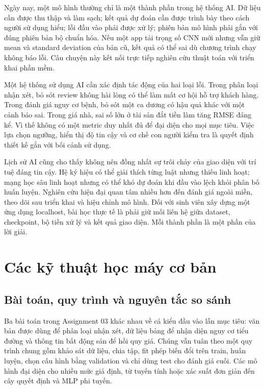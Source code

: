 \documentclass[12pt,a4paper]{report}
\begin{document}
Ngày nay, một mô hình thường chỉ là một thành phần trong hệ thống AI. Dữ liệu cần được thu thập và làm sạch; kết quả dự đoán cần được trình bày theo cách người sử dụng hiểu; lỗi đầu vào phải được xử lý; phiên bản mô hình phải gắn với đúng phiên bản bộ chuẩn hóa. Nếu một app tải trọng số CNN mới nhưng vẫn giữ mean và standard deviation của bản cũ, kết quả có thể sai dù chương trình chạy không báo lỗi. Câu chuyện này kết nối trực tiếp nghiên cứu thuật toán với triển khai phần mềm.

Một hệ thống sử dụng AI cần xác định tác động của hai loại lỗi. Trong phân loại nhận xét, bỏ sót review không hài lòng có thể làm mất cơ hội hỗ trợ khách hàng. Trong đánh giá nguy cơ bệnh, bỏ sót một ca dương có hậu quả khác với một cảnh báo sai. Trong giá nhà, sai số lớn ở tài sản đắt tiền làm tăng RMSE đáng kể. Vì thế không có một metric duy nhất đủ để đại diện cho mọi mục tiêu. Việc lựa chọn ngưỡng, hiển thị độ tin cậy và cơ chế con người kiểm tra là quyết định thiết kế gắn với bối cảnh sử dụng.

Lịch sử AI cũng cho thấy không nên đồng nhất sự trôi chảy của giao diện với trí tuệ đáng tin cậy. Hệ ký hiệu có thể giải thích từng luật nhưng thiếu linh hoạt; mạng học sâu linh hoạt nhưng có thể khó dự đoán khi đầu vào lệch khỏi phân bố huấn luyện. Nghiên cứu hiện đại quan tâm nhiều hơn đến đánh giá ngoài miền, theo dõi sau triển khai và hiệu chỉnh mô hình. Đối với sinh viên xây dựng một ứng dụng localhost, bài học thực tế là phải giữ mối liên hệ giữa dataset, checkpoint, bộ tiền xử lý và kết quả giao diện. Mỗi thành phần là một phần của lời giải.

\chapter{Các kỹ thuật học máy cơ bản}\label{ch:ml}
\section{Bài toán, quy trình và nguyên tắc so sánh}
Ba bài toán trong Assignment 03 khác nhau về cả kiểu đầu vào lẫn mục tiêu: văn bản được dùng để phân loại nhận xét, dữ liệu bảng để nhận diện nguy cơ tiểu đường và thông tin bất động sản để hồi quy giá. Chúng vẫn tuân theo một quy trình chung gồm khảo sát dữ liệu, chia tập, fit phép biến đổi trên train, huấn luyện, chọn cấu hình bằng validation và chỉ dùng test cho đánh giá cuối. Các mô hình đại diện cho nhiều mức giả định, từ tuyến tính hoặc xác suất đơn giản đến cây quyết định và MLP phi tuyến.
\end{document}
